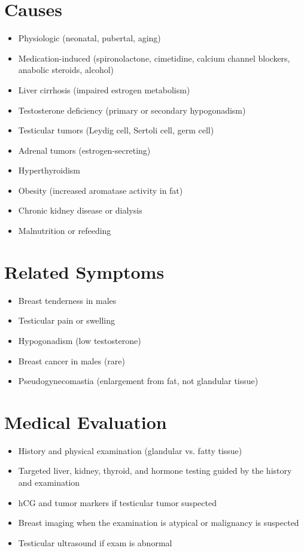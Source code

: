 \section*{Causes}
\begin{itemize}
\item Physiologic (neonatal, pubertal, aging)
\item Medication-induced (spironolactone, cimetidine, calcium channel blockers, anabolic steroids, alcohol)
\item Liver cirrhosis (impaired estrogen metabolism)
\item Testosterone deficiency (primary or secondary hypogonadism)
\item Testicular tumors (Leydig cell, Sertoli cell, germ cell)
\item Adrenal tumors (estrogen-secreting)
\item Hyperthyroidism
\item Obesity (increased aromatase activity in fat)
\item Chronic kidney disease or dialysis
\item Malnutrition or refeeding
\end{itemize}

\section*{Related Symptoms}
\begin{itemize}
\item Breast tenderness in males
\item Testicular pain or swelling
\item Hypogonadism (low testosterone)
\item Breast cancer in males (rare)
\item Pseudogynecomastia (enlargement from fat, not glandular tissue)
\end{itemize}

\section*{Medical Evaluation}
\begin{itemize}
\item History and physical examination (glandular vs. fatty tissue)
\item Targeted liver, kidney, thyroid, and hormone testing guided by the history and examination
\item hCG and tumor markers if testicular tumor suspected
\item Breast imaging when the examination is atypical or malignancy is suspected
\item Testicular ultrasound if exam is abnormal
\end{itemize}

